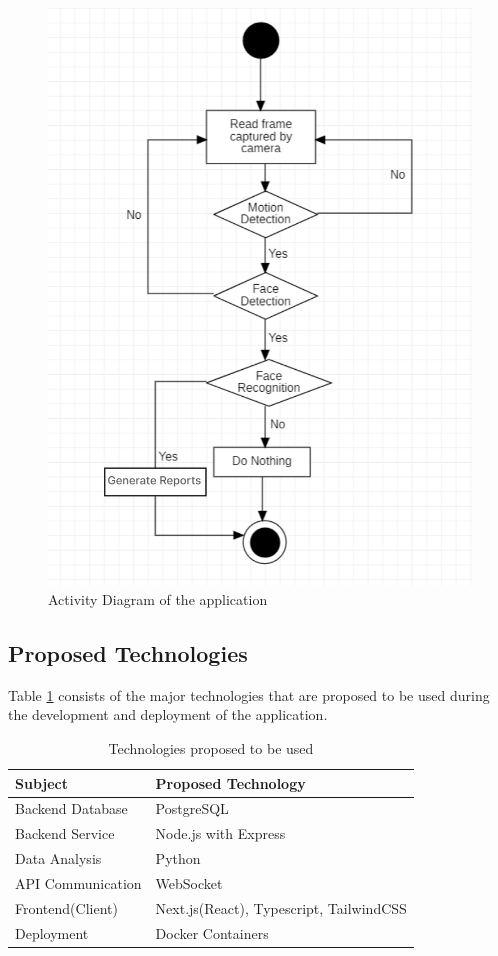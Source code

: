 \begin{figure}[H]
    \includegraphics[width=0.6\linewidth]{figures/activity-diagram.png}
    \centering
    \caption{Activity Diagram\cite{yasmeensmart} of the application}
    \label{fig:activity}
\end{figure}

\subsection{Proposed Technologies}
Table \ref{table:tech} consists of the major technologies that are proposed to be used during the development and deployment of the application.

\renewcommand{\arraystretch}{1.5}
\begin{table}[H]
\centering
    \begin{tabular}{|l|l|}
        \hline
        \textbf{Subject}    & \textbf{Proposed Technology} \\ \hline
        Backend Database            & PostgreSQL           \\ \hline
        Backend Service    & Node.js with Express        \\ \hline
        Data Analysis    & Python        \\ \hline
        API Communication & WebSocket \\ \hline
        Frontend(Client)  & Next.js(React), Typescript, TailwindCSS              \\ \hline
        Deployment  & Docker Containers              \\ \hline
    \end{tabular}
    \caption{Technologies proposed to be used}
    \label{table:tech}
\end{table}

